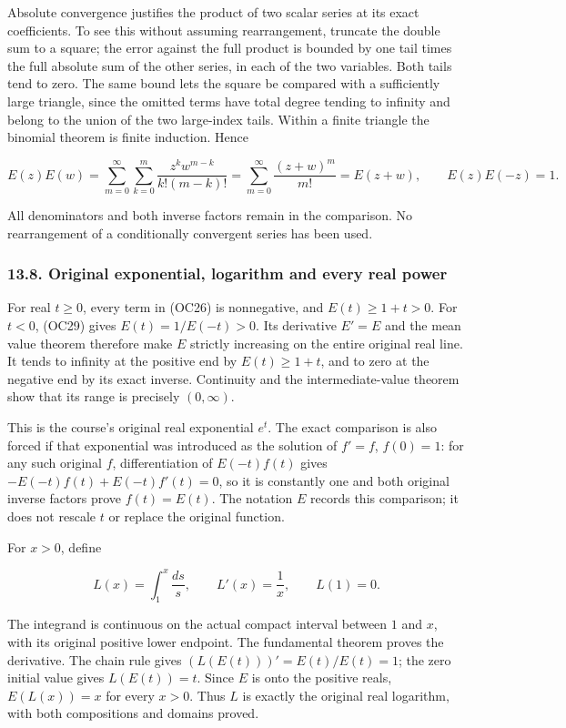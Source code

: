 \documentclass[
  11pt,
]{article}
\begin{document}
Absolute convergence justifies the product of two scalar series at its
exact coefficients. To see this without assuming rearrangement, truncate
the double sum to a square; the error against the full product is
bounded by one tail times the full absolute sum of the other series, in
each of the two variables. Both tails tend to zero. The same bound lets
the square be compared with a sufficiently large triangle, since the
omitted terms have total degree tending to infinity and belong to the
union of the two large-index tails. Within a finite triangle the
binomial theorem is finite induction. Hence

\[
 E(z)E(w)
 =\sum_{m=0}^\infty\sum_{k=0}^m
       \frac{z^k w^{m-k}}{k!(m-k)!}
 =\sum_{m=0}^\infty\frac{(z+w)^m}{m!}
 =E(z+w),\qquad E(z)E(-z)=1.
\tag{OC29}
\]

All denominators and both inverse factors remain in the comparison. No
rearrangement of a conditionally convergent series has been used.

\subsubsection{13.8. Original exponential, logarithm and every real
power}\label{original-exponential-logarithm-and-every-real-power}

For real \(t\ge0\), every term in (OC26) is nonnegative, and
\(E(t)\ge1+t>0\). For \(t<0\), (OC29) gives \(E(t)=1/E(-t)>0\). Its
derivative \(E'=E\) and the mean value theorem therefore make \(E\)
strictly increasing on the entire original real line. It tends to
infinity at the positive end by \(E(t)\ge1+t\), and to zero at the
negative end by its exact inverse. Continuity and the intermediate-value
theorem show that its range is precisely \((0,\infty)\).

This is the course's original real exponential \(e^t\). The exact
comparison is also forced if that exponential was introduced as the
solution of \(f'=f\), \(f(0)=1\): for any such original \(f\),
differentiation of \(E(-t)f(t)\) gives \(-E(-t)f(t)+E(-t)f'(t)=0\), so
it is constantly one and both original inverse factors prove
\(f(t)=E(t)\). The notation \(E\) records this comparison; it does not
rescale \(t\) or replace the original function.

For \(x>0\), define

\[
 L(x)=\int_1^x\frac{ds}{s},\qquad
 L'(x)=\frac1x,\qquad L(1)=0.
\tag{OC30}
\]

The integrand is continuous on the actual compact interval between \(1\)
and \(x\), with its original positive lower endpoint. The fundamental
theorem proves the derivative. The chain rule gives
\((L(E(t)))'=E(t)/E(t)=1\); the zero initial value gives \(L(E(t))=t\).
Since \(E\) is onto the positive reals, \(E(L(x))=x\) for every \(x>0\).
Thus \(L\) is exactly the original real logarithm, with both
compositions and domains proved.
\end{document}
